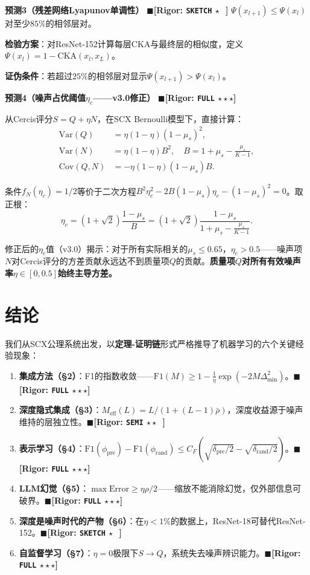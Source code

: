 \documentclass[12pt,a4paper]{ctexart}
\theoremstyle{definition}
\theoremstyle{remark}
\newcommand{\rigorFull}{$\blacksquare$\;\textbf{[Rigor: \texttt{FULL} $\star\star\star$]}}
\newcommand{\rigorSemi}{$\blacksquare$\;\textbf{[Rigor: \texttt{SEMI} $\star\star\;\;$]}}
\newcommand{\rigorSketch}{$\blacksquare$\;\textbf{[Rigor: \texttt{SKETCH} $\star\;\;\,$]}}
\begin{document}
\medskip
\textbf{预测3（残差网络Lyapunov单调性）}
\rigorSketch
$\Psi(x_{l+1}) \leq \Psi(x_l)$对至少$85\%$的相邻层对。

\textbf{检验方案}：对ResNet-152计算每层CKA与最终层的相似度，定义$\Psi(x_l) = 1 - \mathrm{CKA}(x_l, x_L)$。

\textbf{证伪条件}：若超过$25\%$的相邻层对显示$\Psi(x_{l+1}) > \Psi(x_l)$。

\medskip
\textbf{预测4（噪声占优阈值$\eta_c$——v3.0修正）}
\rigorFull

从Cercis评分$S = Q + \eta N$，在SCX Bernoulli模型下，直接计算：
\begin{align}
\mathrm{Var}(Q) &= \eta(1-\eta)(1-\mu_s)^2, \\
\mathrm{Var}(N) &= \eta(1-\eta)B^2, \quad B = 1 + \mu_s - \frac{\mu_s}{K-1}, \\
\mathrm{Cov}(Q,N) &= -\eta(1-\eta)(1-\mu_s)B.
\end{align}

条件$f_N(\eta_c) = 1/2$等价于二次方程$B^2\eta_c^2 - 2B(1-\mu_s)\eta_c - (1-\mu_s)^2 = 0$。取正根：
\begin{equation}
\boxed{\eta_c = (1+\sqrt{2})\frac{1-\mu_s}{B} = (1+\sqrt{2})\frac{1-\mu_s}{1 + \mu_s - \frac{\mu_s}{K-1}}}.
\end{equation}

修正后的$\eta_c$值（v3.0）揭示：对于所有实际相关的$\mu_s \leq 0.65$，$\eta_c > 0.5$——噪声项$N$对Cercis评分的方差贡献永远达不到质量项$Q$的贡献。\textbf{质量项$Q$对所有有效噪声率$\eta \in [0, 0.5]$始终主导方差。}

\section*{结论}

我们从SCX公理系统出发，以\textbf{定理-证明链}形式严格推导了机器学习的六个关键经验现象：
\begin{enumerate}
\item \textbf{集成方法（\S2）}：F1的指数收敛——$\mathrm{F1}(M) \geq 1 - \frac{1}{\eta}\exp(-2M\Delta_{\min}^2)$。\rigorFull
\item \textbf{深度隐式集成（\S3）}：$M_{\text{eff}}(L) = L/(1+(L-1)\bar{\rho})$，深度收益源于噪声维持的层独立性。\rigorSemi
\item \textbf{表示学习（\S4）}：$\mathrm{F1}(\phi_{\text{pre}}) - \mathrm{F1}(\phi_{\text{rand}}) \leq C_F(\sqrt{\delta_{\text{pre}}/2} - \sqrt{\delta_{\text{rand}}/2})$。\rigorFull
\item \textbf{LLM幻觉（\S5）}：$\max\text{Error} \geq \eta\rho/2$——缩放不能消除幻觉，仅外部信息可破界。\rigorFull
\item \textbf{深度是噪声时代的产物（\S6）}：在$\eta < 1\%$的数据上，ResNet-18可替代ResNet-152。\rigorSketch
\item \textbf{自监督学习（\S7）}：$\eta=0$极限下$S \to Q$，系统失去噪声辨识能力。\rigorFull
\end{enumerate}
\end{document}
